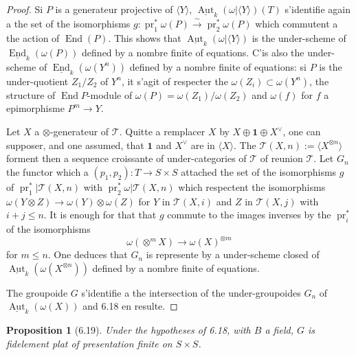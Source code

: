 \documentclass[12pt,a4paper]{article}
\theoremstyle{plain}
\newtheorem{proposition}[theorem]{Proposition}
\theoremstyle{definition}
\DeclareMathOperator{\End}{End}
\DeclareMathOperator{\Aut}{Aut}
\DeclareMathOperator{\pr}{pr}
\begin{document}
\begin{proof}
Si $P$ is a generateur projective of $\langle Y \rangle$, $\underline{\Aut}_k(\omega|\langle Y \rangle)(T)$ s'identifie again a the set of the isomorphisms $g : \pr_1^*\omega(P) \xrightarrow{\sim} \pr_2^*\omega(P)$ which commutent a the action of $\End(P)$. This shows that $\underline{\Aut}_k(\omega|\langle Y \rangle)$ is the under-scheme of $\underline{\End}_k(\omega(P))$ defined by a nombre finite of equations. C'is also the under-scheme of $\underline{\End}_k(\omega(Y^n))$ defined by a nombre finite of equations: si $P$ is the under-quotient $Z_1/Z_2$ of $Y^n$, it s'agit of respecter the $\omega(Z_i) \subset \omega(Y^n)$, the structure of $\End P$-module of $\omega(P) = \omega(Z_1)/\omega(Z_2)$ and $\omega(f)$ for $f$ a epimorphisme $P^m \to Y$.

Let $X$ a $\otimes$-generateur of $\mathcal{T}$. Quitte a remplacer $X$ by $X \oplus \mathbf{1} \oplus X^\vee$, one can supposer, and one assumed, that $\mathbf{1}$ and $X^\vee$ are in $\langle X \rangle$. The $\mathcal{T}(X, n) := \langle X^{\otimes n} \rangle$ forment then a sequence croissante of under-categories of $\mathcal{T}$ of reunion $\mathcal{T}$. Let $G_n$ the functor which a $(p_1, p_2) : T \to S \times S$ attached the set of the isomorphisms $g$ of $\pr_1^*|\mathcal{T}(X, n)$ with $\pr_2^*\omega|\mathcal{T}(X, n)$ which respectent the isomorphisms $\omega(Y \otimes Z) \to \omega(Y) \otimes \omega(Z)$ for $Y$ in $\mathcal{T}(X, i)$ and $Z$ in $\mathcal{T}(X, j)$ with $i + j \leq n$. It is enough for that that $g$ commute to the images inverses by the $\pr_i^*$ of the isomorphisms
\[
\omega(\otimes^m X) \to \omega(X)^{\otimes m}
\]
for $m \leq n$. One deduces that $G_n$ is represente by a under-scheme closed of $\underline{\Aut}_k(\omega(X^{\otimes n}))$ defined by a nombre finite of equations.

The groupoide $G$ s'identifie a the intersection of the under-groupoides $G_n$ of $\underline{\Aut}_k(\omega(X))$ and 6.18 en resulte.
\end{proof}

\begin{proposition}[6.19]
Under the hypotheses of 6.18, with $B$ a field, $G$ is fidelement plat of presentation finite on $S \times S$.
\end{proposition}
\end{document}
